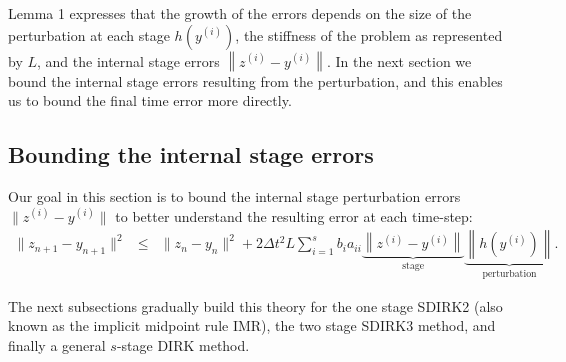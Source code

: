 \documentclass{siamart251104}
\newtheorem{rmk}{Remark}
\newcommand{\dt}{\Delta t}
\begin{document}
{Lemma 1 expresses that the growth of the errors
depends on the size of the perturbation at each stage $h(y^{(i)})$, 
the stiffness of the problem as represented by $L$, 
and the internal stage errors $ \left\| z^{(i)} - y^{(i)}\right\|$.}
In the next section we bound the internal stage errors 
resulting from the perturbation, and this enables us to
bound the final time error more directly.

 

\subsection{Bounding the internal stage errors}
Our goal in this section is to bound the internal stage
perturbation errors 
$\| z^{(i)} - y^{(i)} \|$ 
to better understand the resulting error
at each time-step:
\begin{eqnarray*}
\| z_{n+1} - y_{n+1}\|^2 &\leq &
\|z_n - y_n \|^2   + 2 \dt^2 L 
\sum_{i=1}^s b_{i} a_{ii}
\underbrace{\left\| z^{(i)} -  y^{(i)} \right\|}_{\mbox{stage}}   
\underbrace{\left\| h(y^{(i)}) \right\|}_{\mbox{perturbation}}.
    \end{eqnarray*}
    

 The next subsections gradually build this theory
for the one stage  SDIRK2 (also known as the implicit midpoint rule IMR), 
the two stage SDIRK3 method, 
and finally a general $s$-stage DIRK method.
\end{document}
